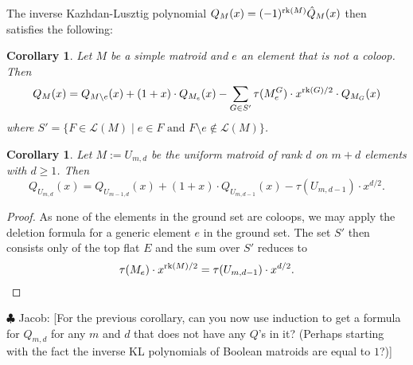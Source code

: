 \documentclass[10pt]{article}
\newcommand{\calL}{\mathcal{L}}
\newcommand{\rank}{\normalfont\text{rk}}
\newtheorem{corollary}[theorem]{Corollary}
\theoremstyle{remark}
\newcommand{\jacob}[1]{{\color{Bittersweet} \sf $\clubsuit$ Jacob: [#1]}}
\begin{document}
The inverse Kazhdan-Lusztig polynomial $Q_M(x) = (-1)^{\rank(M)}\hat{Q}_M(x)$ then satisfies the following:
\begin{corollary}
\label{cor:deletion_formula_Q}
Let $M$ be a simple matroid and $e$ an element that is not a coloop. Then
\[
    Q_M(x) = Q_{M\setminus e}(x) + (1 + x)\cdot Q_{M_e}(x) -
    \sum_{G \in S'}{\tau(M^G_e)\cdot x^{\rank(G)/2} \cdot
    Q_{M_G}(x)}
\]
where $S' = \{F\in \calL(M)\mid e\in F \text{ and } F\setminus e \notin \calL(M)\}$.
\end{corollary}
\begin{corollary}
\label{cor:deletion_formula_Q_uniform}
Let $M:=U_{m,d}$ be the uniform matroid of rank $d$ on $m+d$ elements with $d\geq 1$. Then
\[
    Q_{U_{m,d}}(x) = Q_{U_{m-1,d}}(x) + (1 + x)\cdot Q_{U_{m,d-1}}(x) -
    \tau(U_{m,d-1})\cdot x^{d/2}.
\]
\end{corollary}
\begin{proof}
    As none of the elements in the ground set are coloops, we may apply the deletion formula for a generic element $e$ in the ground set. The set $S'$ then consists only of the top flat $E$ and the sum over $S'$ reduces to \[\tau(M_e)\cdot x^{\rank(M)/2}
    = \tau(U_{m,d-1})\cdot x^{d/2}.\]
\end{proof}

\jacob{For the previous corollary, can you now use induction to get a formula for $Q_{m,d}$ for any $m$ and $d$ that does not have any $Q$'s in it?  (Perhaps starting with the fact the inverse KL polynomials of Boolean matroids are equal to $1$?)}
\printbibliography %
\end{document}
